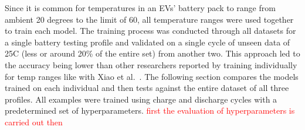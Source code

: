 %
Since it is common for temperatures in an EVs' battery pack to range from ambient 20 degrees to the limit of 60, all temperature ranges were used together to train each model.
The training process was conducted through all datasets for a single battery testing profile and validated on a single cycle of unseen data of 25\textdegree{}C (less or around 20\% of the entire set) from another two.
This approach led to the accuracy being lower than other researchers reported by training individually for temp ranges like with Xiao et al.~\cite{xiao_accurate_2019}. %
The following section compares the models trained on each individual and then tests against the entire dataset of all three profiles.
All examples were trained using charge and discharge cycles with a predetermined set of hyperparameters. %
\textcolor{red}{first the evaluation of hyperparameters is carried out then}
%

%

